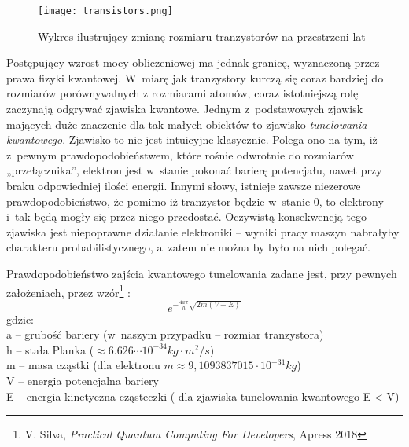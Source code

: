 \documentclass[12pt,a4paper,twoside,openany]{book}
\begin{document}
\begin{figure}[H] \label{graph-transis}
\texttt{[image: transistors.png]}
\caption{Wykres ilustrujący zmianę rozmiaru tranzystorów na przestrzeni lat}
\end{figure}
	




Postępujący wzrost mocy obliczeniowej ma jednak granicę, wyznaczoną przez prawa fizyki kwantowej.  
W~miarę jak tranzystory kurczą się coraz bardziej do rozmiarów porównywalnych z rozmiarami atomów, coraz istotniejszą rolę zaczynają odgrywać zjawiska kwantowe. 
Jednym z~podstawowych zjawisk mających duże znaczenie dla tak małych obiektów to zjawisko \textit{tunelowania kwantowego}. 
Zjawisko to nie jest intuicyjne klasycznie.
Polega ono na tym, iż z~pewnym prawdopodobieństwem, które rośnie odwrotnie do rozmiarów „przełącznika”, elektron jest w~stanie pokonać barierę potencjału, nawet przy braku odpowiedniej ilości energii.
Innymi słowy, istnieje zawsze niezerowe prawdopodobieństwo, że pomimo iż tranzystor będzie w~stanie 0, to elektrony i~tak będą mogły się przez niego przedostać.
Oczywistą konsekwencją tego zjawiska jest niepoprawne działanie elektroniki – wyniki pracy maszyn nabrałyby charakteru probabilistycznego, a~zatem nie można by było na nich polegać.
	
Prawdopodobieństwo zajścia kwantowego tunelowania zadane jest, przy pewnych założeniach, przez wzór\footnote{V. Silva, \textit{Practical Quantum Computing For Developers}, Apress 2018} :
\begin{equation}
e^{-\frac{4a\pi}{h}\sqrt{2m(V - E)}}
\end{equation}
gdzie: \\
\indent a – grubość bariery (w~naszym przypadku – rozmiar tranzystora) \\
\indent h – stała Planka ($ \approx 6.626 \cdots 10^{-34}  kg  \cdot m^2 / s$) \\
\indent m – masa cząstki (dla elektronu $m \approx 9,109 3837015 \cdot 10^{-31} kg$) \\
\indent V – energia potencjalna bariery \\ 
\indent E – energia kinetyczna cząsteczki ( dla zjawiska tunelowania kwantowego E < V) \\
\end{document}
